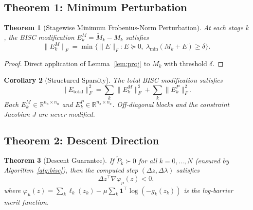 \documentclass[11pt]{article}
\newtheorem{theorem}{Theorem}
\newtheorem{corollary}[theorem]{Corollary}
\begin{document}
\subsection{Theorem 1: Minimum Perturbation}

\begin{theorem}[Stagewise Minimum Frobenius-Norm Perturbation]\label{thm:minpert}
At each stage $k$, the BISC modification $E_k^M = \tilde{M}_k - M_k$ satisfies
\begin{equation}
  \|E_k^M\|_F = \min\bigl\{\|E\|_F : E \succeq 0, \;
  \lambda_{\min}(M_k + E) \ge \delta\bigr\}.
\end{equation}
\end{theorem}

\begin{proof}
Direct application of Lemma~\ref{lem:proj} to $M_k$ with threshold $\delta$.
\end{proof}

\begin{corollary}[Structured Sparsity]
The total BISC modification satisfies
\begin{equation}
  \|E_{\mathrm{total}}\|_F^2 = \sum_k \|E_k^M\|_F^2 + \sum_k \|E_k^P\|_F^2.
\end{equation}
Each $E_k^M \in \mathbb{R}^{n_u \times n_u}$ and $E_k^P \in \mathbb{R}^{n_x \times n_x}$.
Off-diagonal blocks and the constraint Jacobian $J$ are \emph{never modified}.
\end{corollary}


\subsection{Theorem 2: Descent Direction}

\begin{theorem}[Descent Guarantee]\label{thm:descent}
If $\tilde{P}_k \succ 0$ for all $k = 0, \dots, N$ (ensured by Algorithm~\ref{alg:bisc}),
then the computed step $(\Delta z, \Delta \lambda)$ satisfies
\begin{equation}
  \Delta z^\top \nabla \varphi_\mu(z) < 0,
\end{equation}
where $\varphi_\mu(z) = \sum_k \ell_k(z_k) - \mu \sum_k \mathbf{1}^\top \log(-g_k(z_k))$
is the log-barrier merit function.
\end{theorem}
\end{document}
